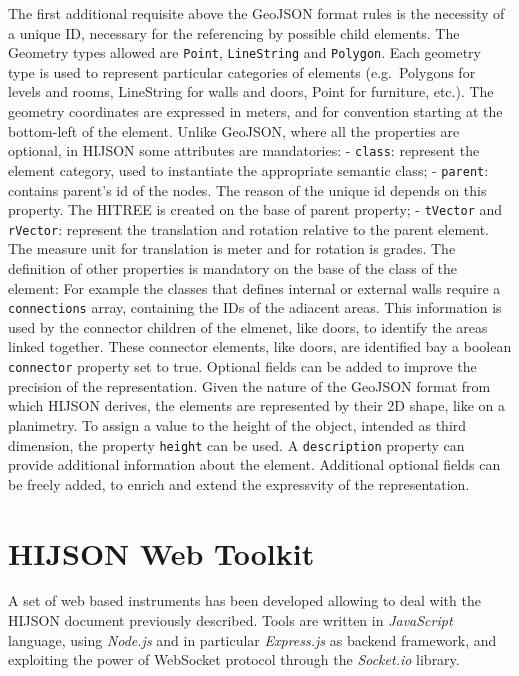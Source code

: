 \documentclass{sig-alternate}
\begin{document}
The first additional requisite above the GeoJSON format rules is the necessity of a unique ID, necessary for the referencing by possible child elements. The Geometry types allowed are \texttt{Point}, \texttt{LineString} and \texttt{Polygon}. Each geometry type is used to represent particular categories of elements (e.g.~Polygons for levels and rooms, LineString for walls and doors, Point for furniture, etc.). The geometry coordinates are expressed in meters, and for convention starting at the bottom-left of the element. Unlike GeoJSON, where all the properties are optional, in HIJSON some attributes are mandatories: - \texttt{class}: represent the element category, used to instantiate the appropriate semantic class; - \texttt{parent}: contains parent's id of the nodes. The reason of the unique id depends on this property. The HITREE is created on the base of parent property; - \texttt{tVector} and \texttt{rVector}: represent the translation and rotation relative to the parent element. The measure unit for translation is meter and for rotation is grades. The definition of other properties is mandatory on the base of the class of the element: For example the classes that defines internal or external walls require a \texttt{connections} array, containing the IDs of the adiacent areas. This information is used by the connector children of the elmenet, like doors, to identify the areas linked together. These connector elements, like doors, are identified bay a boolean \texttt{connector} property set to true. Optional fields can be added to improve the precision of the representation. Given the nature of the GeoJSON format from which HIJSON derives, the elements are represented by their 2D shape, like on a planimetry. To assign a value to the height of the object, intended as third dimension, the property \texttt{height} can be used. A \texttt{description} property can provide additional information about the element. Additional optional fields can be freely added, to enrich and extend the expressvity of the representation.

\section{HIJSON Web Toolkit}\label{hijson-web-toolkit}

A set of web based instruments has been developed allowing to deal with the HIJSON document previously described. Tools are written in \emph{JavaScript} language, using \emph{Node.js} and in particular \emph{Express.js} as backend framework, and exploiting the power of WebSocket protocol through the \emph{Socket.io} library.
\end{document}
